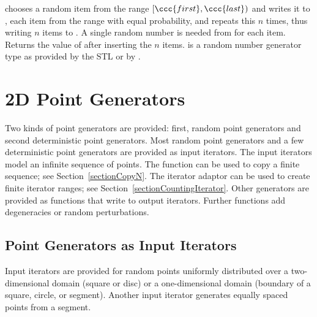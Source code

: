 
{ chooses a random item from the range $[\ccc{first},\ccc{last})$ and
    writes it to , each item from the range with equal
    probability, and repeats this $n$ times, thus writing $n$ items to
    .
    A single random number is needed from  for each item.
    Returns the value of  after inserting the $n$ items.
    \ccPrecond {} is a random number generator type as provided 
    by the STL or by .
}


\section{2D Point Generators}
\label{sectionPointGenerators}

Two kinds of point generators are provided: first, random point
generators and second deterministic point generators. Most random
point generators and a few deterministic point generators are provided
as input iterators.  The input iterators model an infinite sequence of
points. The function  can be used to copy a
finite sequence; see Section~\ref{sectionCopyN}. The iterator adaptor
 can be used to create finite iterator
ranges; see Section~\ref{sectionCountingIterator}.
Other generators are provided as functions that write to output
iterators. Further functions add degeneracies or random perturbations.


\subsection{Point Generators as Input Iterators}

\ccDefinition

Input iterators are provided for random points uniformly distributed
over a two-dimensional domain (square or disc) or a one-dimensional
domain (boundary of a square, circle, or segment). Another input
iterator generates equally spaced points from a segment.

